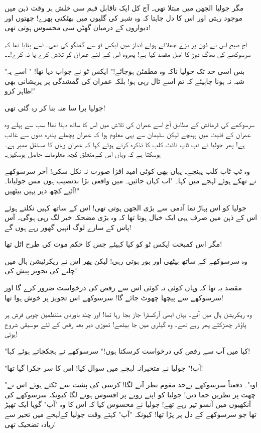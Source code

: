 مگر جولیا الجھن میں مبتلا تھی۔ آج کل ایک ناقابل فہم سی خلش ہر وقت ذہن میں موجود رہتی اور اس کا دل چاہتا کہ وہ شہر کی گلیوں میں بھٹکتی پھرے! چھتوں اور دیواروں کے درمیان گھٹن سی محسوس ہوتی تھی!

آج صبح اس نے فون پر بڑے جھلائے ہوئے انداز میں ایکس ٹو سے گفتگو کی تھی۔ اسے بتایا تھا کہ سرسوکھے کی بھاگ دوڑ کا اصل مقصد کیا ہے! پھروہ اس کے لئے عمران کو تلاش کرے یا نہ کرے!۔۔

"بس اسی حد تک جولیا ناکہ وہ مطمئن ہوجائے!" ایکس ٹو نے جواب دیا تھا! " اسے یہ شبہ نہ ہونا چاہیئے کہ تم اسے ٹال رہی ہو! بلکہ عمران کی گمشدگی پر پریشانی بھی ظاہر کرو!"

جولیا برا سا منہ بنا کر رہ گئی تھی!

سرسوکھے کی فرمائش کے مطابق آج اسے عمران کی تلاش میں اس کا ساتھ دینا تھا! سب سے پہلے وہ عمران کے فلیٹ میں پہنچے لیکن سلیمان سے یہی معلوم ہوا کہ عمران پچھلے پندرہ دنوں سے غائب ہے! پھر جولیا نے ٹپ ٹاپ نائٹ کلب کا تذکرہ کرتے ہوئے کہا کہ عمران وہاں کا مستقل ممبر ہے۔ ہوسکتا ہے کہ وہاں اس کےمتعلق کچھ معلومات حاصل ہوسکیں۔

وہ ٹپ ٹاپ کلب پہنچے۔ یہاں بھی کوئی امید افزا صورت نہ نکل سکی! آخر سرسوکھے نے تھکے ہوئے لہجے میں کہا۔ "اب کہاں جائیں۔ میں واقعی بڑا بدنصیب ہوں مس جولیانا۔ آئیے کچھ دیر یہیں بیٹھیں!"

جولیا کو اس پہاڑ نما آدمی سے بڑی الجھن ہوتی تھی! اس کے ساتھ کہیں نکلتے ہوئے اس کے ذہن میں صرف یہی ایک خیال ہوتا تھا کہ وہ بڑی مضحکہ خیز لگ رہی ہوگی۔ آس پاس کے سارے لوگ انہیں گھور رہے ہوں گے!

مگر اس کمبخت ایکس ٹو کو کیا کہیئے جس کا حکم موت کی طرح اٹل تھا!

وہ سرسوکھے کے ساتھ بیٹھی اور بور ہوتی رہی! لیکن پھر اس نے ریکرئیشن ہال میں چلنے کی تجویز پیش کی!

مقصد یہ تھا کہ وہاں کوئی نہ کوئی اس سے رقص کی درخواست ضرور کرے گا اور سرسوکھے سے پیچھا چھوٹ جائے گا! سرسوکھے اس تجویز پر خوش ہوا تھا!

وہ ریکریشن ہال میں آئے۔ یہاں ابھی آرکسٹرا جاز بجا رہا تھا! اور چند باوردی منتظمین چوبی فرش پر پاؤڈر چھڑکتے پھر رہے تھے۔
وہ گیلری میں جا بیٹھے! تھوڑی دیر بعد رقص کے لئے موسیقی شروع ہوئی!

"کیا میں آپ سے رقص کی درخواست کرسکتا ہوں!" سرسوکھے نے ہچکچاتے ہوئے کہا!

"آپ!" جولیا نے متحیرانہ لہجے میں سوال کیا! اس کا سر چکرا گیا تھا!

"اوہ"۔ دفعتاً سرسوکھے بےحد مغوم نظر آنے لگا! کرسی کی پشت سے ٹکتے ہوئے اس نے چھت پر نظریں جما دیں! جولیا کو اپنے رویے پر افسوس ہونے لگا کیونکہ سرسوکھے کی آنکھیوں میں آنسو تیر رہے تھے! جولیا نے محسوس کیا کہ اس کا وہ "آپ" گویا ایک تھپڑ تھا جو سرسوکھے کے دل پر پڑا تھا! کیونکہ "آپ" کہتے وقت جولیا کےلہجے میں تحیر سے زیادہ تضحیک تھی!


